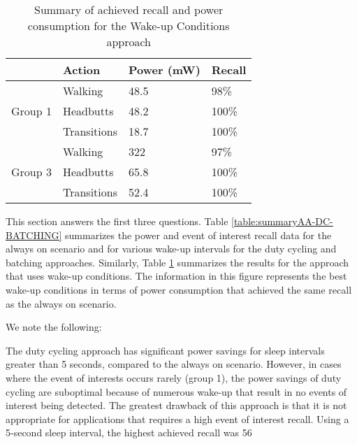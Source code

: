 \begin{table}[t]
    \begin{tabular}{|l|l|l|l|}
	\hline
    ~       					& Action      & Power (mW) & Recall \\ \hline
    \multirow{3}{*}{Group 1} 	& Walking     & 48.5       & 98\%   \\ \cline{2-4}
								& Headbutts   & 48.2       & 100\%  \\ \cline{2-4}
								& Transitions & 18.7       & 100\%  \\ \hline
    \multirow{3}{*}{Group 3} 	& Walking     & 322        & 97\%   \\ \cline{2-4}
								& Headbutts   & 65.8       & 100\%  \\ \cline{2-4}
								& Transitions & 52.4       & 100\%  \\ \hline
    \end{tabular}
	\caption{Summary of achieved recall and power consumption for the Wake-up Conditions approach}
	\label{table:summaryWUC}
\end{table}

This section answers the first three questions. Table \ref{table:summaryAA-DC-BATCHING} summarizes the power and event of interest recall data for the always on scenario and for various wake-up intervals for the duty cycling and batching approaches. Similarly, Table \ref{table:summaryWUC} summarizes the results for the approach that uses wake-up conditions. The information in this figure represents the best wake-up conditions in terms of power consumption that achieved the same recall as the always on scenario.

We note the following:

The duty cycling approach has significant power savings for sleep intervals greater than 5 seconds, compared to the always on scenario. However, in cases where the event of interests occurs rarely (group 1), the power savings of duty cycling are suboptimal because of numerous wake-up that result in no events of interest being detected. The greatest drawback of this approach is that it is not appropriate for applications that requires a high event of interest recall. Using a 5-second sleep interval, the highest achieved recall was 56%

